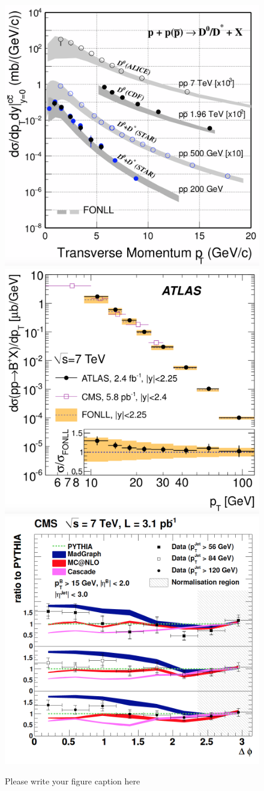 \documentclass{webofc}
\begin{document}
\begin{figure}[ht]
\centering
\includegraphics[width=.32\textwidth]{Plots/Dcross_sectionLHCRHIC}
\includegraphics[width=.32\textwidth]{Plots/BplusATLASpp}
\includegraphics[width=.32\textwidth]{Plots/BBbarCMS7TeV}
\caption{Please write your figure caption here}
\label{fig:ppresults}     
\end{figure}
\end{document}
